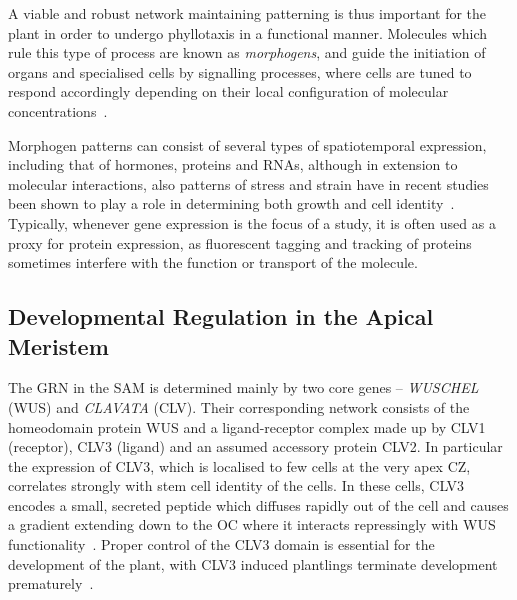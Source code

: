 A viable and robust network maintaining patterning is thus important for 
the plant in order to undergo phyllotaxis in a functional manner. Molecules
which rule this type of  
process are known as \textit{morphogens}, and guide the initiation of organs and
specialised cells by signalling processes, where cells are tuned to respond
accordingly depending on their local configuration of molecular
concentrations~\cite{lawrence1996morphogens}.

Morphogen patterns can consist of several
types of spatiotemporal expression, including that of hormones, proteins and
RNAs, although in extension to molecular interactions, also patterns
of stress and strain have in recent studies been shown to play a role in
determining both growth and cell
identity~\cite{Bozorg2016,hamant2008developmental}. Typically, whenever gene expression is the focus of a study, it
is often used as a proxy for protein expression, as fluorescent tagging
and tracking of proteins sometimes interfere with the function or transport of
the molecule. 

\subsection{Developmental Regulation in the Apical Meristem} %
The GRN in the SAM is determined mainly by two core genes -- \textit{WUSCHEL} (WUS) and
\textit{CLAVATA} (CLV). Their corresponding network consists of the homeodomain
protein WUS and a ligand-receptor complex made up by CLV1 (receptor), CLV3 (ligand) and
an assumed accessory protein CLV2. In particular the expression of CLV3, which
is localised to few cells at the very apex CZ, correlates strongly with stem cell identity of
the cells. In these cells, CLV3 encodes a small, secreted peptide which diffuses
rapidly out of the cell and causes a gradient extending down to the OC where it
interacts repressingly with WUS functionality~\cite{clark2001cell}. Proper control of the CLV3 domain
is essential for the development of the plant, with CLV3 induced plantlings
terminate development prematurely~\cite{brand2002regulation}.

